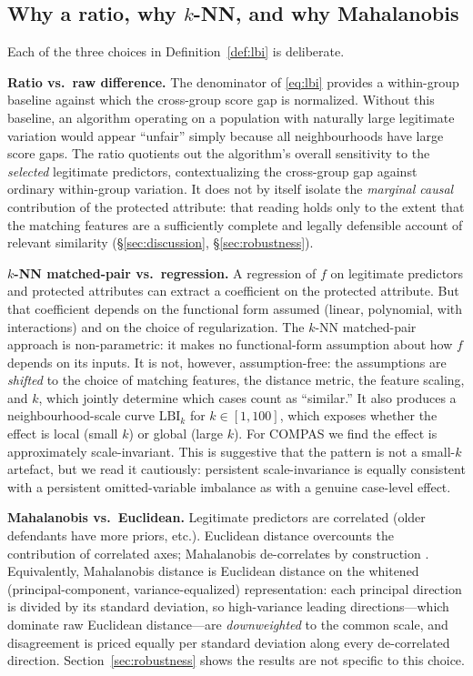 \documentclass[11pt]{article}
\begin{document}
\subsection{Why a ratio, why $k$-NN, and why Mahalanobis}

Each of the three choices in Definition~\ref{def:lbi} is deliberate.

\textbf{Ratio vs.\ raw difference.} The denominator of
\eqref{eq:lbi} provides a within-group baseline against which the
cross-group score gap is normalized. Without this baseline, an
algorithm operating on a population with naturally large legitimate
variation would appear ``unfair'' simply because all neighbourhoods
have large score gaps. The ratio quotients out the algorithm's overall
sensitivity to the \emph{selected} legitimate predictors, contextualizing
the cross-group gap against ordinary within-group variation. It does not
by itself isolate the \emph{marginal causal} contribution of the
protected attribute: that reading holds only to the extent that the
matching features are a sufficiently complete and legally defensible
account of relevant similarity (\S\ref{sec:discussion},
\S\ref{sec:robustness}).

\textbf{$k$-NN matched-pair vs.\ regression.} A regression of $f$ on
legitimate predictors and protected attributes can extract a
coefficient on the protected attribute. But that coefficient depends
on the functional form assumed (linear, polynomial, with
interactions) and on the choice of regularization. The $k$-NN matched-pair
approach is non-parametric: it makes no functional-form assumption
about how $f$ depends on its inputs. It is not, however, assumption-free:
the assumptions are \emph{shifted} to the choice of matching features,
the distance metric, the feature scaling, and $k$, which jointly
determine which cases count as ``similar.'' It also produces a
neighbourhood-scale curve $\mathrm{LBI}_k$ for $k \in [1, 100]$, which
exposes whether the effect is local (small $k$) or global (large $k$).
For COMPAS we find the effect is approximately scale-invariant. This is
suggestive that the pattern is not a small-$k$ artefact, but we read it
cautiously: persistent scale-invariance is equally consistent with a
persistent omitted-variable imbalance as with a genuine case-level
effect.

\textbf{Mahalanobis vs.\ Euclidean.} Legitimate predictors are
correlated (older defendants have more priors, etc.). Euclidean
distance overcounts the contribution of correlated axes; Mahalanobis
de-correlates by construction \citep{mahalanobis1936}. Equivalently,
Mahalanobis distance is Euclidean distance on the whitened
(principal-component, variance-equalized) representation: each
principal direction is divided by its standard deviation, so
high-variance leading directions---which dominate raw Euclidean
distance---are \emph{downweighted} to the common scale, and
disagreement is priced equally per standard deviation along every
de-correlated direction. Section~\ref{sec:robustness} shows the
results are not specific to this choice.
\end{document}
